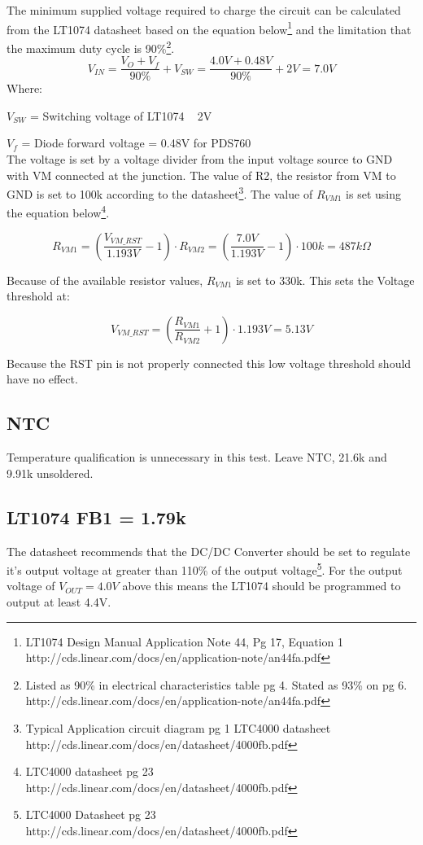 \documentclass{article}
\begin{document}
The minimum supplied voltage required to charge the circuit can be calculated from the LT1074 datasheet based on the equation below\footnote{LT1074 Design Manual Application Note 44, Pg 17, Equation 1 http://cds.linear.com/docs/en/application-note/an44fa.pdf} and the limitation that the maximum duty cycle is 90\%\footnote{Listed as 90\% in electrical characteristics table pg 4. Stated as 93\% on pg 6. http://cds.linear.com/docs/en/application-note/an44fa.pdf}. 
\[V_{IN} = \frac{V_O + V_f}{90\%} + V_{SW} =  \frac{4.0V + 0.48V}{90\%} + 2V = 7.0V\]
Where:

$V_{SW}$ = Switching voltage of LT1074 ~ 2V

$V_{f}$ = Diode forward voltage = 0.48V for PDS760\\

The voltage is set by a voltage divider from the input voltage source to GND with VM connected at the junction. The value of R2, the resistor from VM to GND is set to 100k according to the datasheet\footnote{Typical Application circuit diagram pg 1 LTC4000 datasheet http://cds.linear.com/docs/en/datasheet/4000fb.pdf}. The value of $R_{VM1}$ is set using the equation below\footnote{LTC4000 datasheet pg 23 http://cds.linear.com/docs/en/datasheet/4000fb.pdf}.

\[R_{VM1} = \left (\frac{V_{VM\_RST}}{1.193V}-1\right )\cdot R_{VM2} = \left (\frac{7.0V}{1.193V}-1\right )\cdot 100k = 487k\Omega\]

Because of the available resistor values, $R_{VM1}$ is set to 330k. This sets the Voltage threshold at:

\[V_{VM\_RST} = \left (\frac{R_{VM1}}{R_{VM2}}+1\right )\cdot 1.193V = 5.13V \]

Because the RST pin is not properly connected this low voltage threshold should have no effect.

\subsection{NTC}
Temperature qualification is unnecessary in this test. Leave NTC, 21.6k and 9.91k unsoldered. 

\subsection{LT1074 FB1 = 1.79k}
The datasheet recommends that the DC/DC Converter should be set to regulate it's output voltage at greater than 110\% of the output voltage\footnote{LTC4000 Datasheet pg 23 http://cds.linear.com/docs/en/datasheet/4000fb.pdf}. For the output voltage of $V_{OUT} = 4.0V$ above this means the LT1074 should be programmed to output at least 4.4V. 
\end{document}
